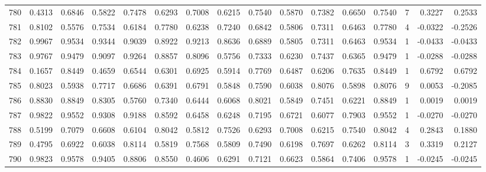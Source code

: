\begin{tabular}{lrrrrrrrrrrrrrrr}
780 &      0.4313 &  0.6846 &  0.5822 &  0.7478 &  0.6293 &  0.7008 &  0.6215 &  0.7540 &  0.5870 &  0.7382 &   0.6650 &     0.7540 &      7 &                    0.3227 &                     0.2533 \\
781 &      0.8102 &  0.5576 &  0.7534 &  0.6184 &  0.7780 &  0.6238 &  0.7240 &  0.6842 &  0.5806 &  0.7311 &   0.6463 &     0.7780 &      4 &                   -0.0322 &                    -0.2526 \\
782 &      0.9967 &  0.9534 &  0.9344 &  0.9039 &  0.8922 &  0.9213 &  0.8636 &  0.6889 &  0.5805 &  0.7311 &   0.6463 &     0.9534 &      1 &                   -0.0433 &                    -0.0433 \\
783 &      0.9767 &  0.9479 &  0.9097 &  0.9264 &  0.8857 &  0.8096 &  0.5756 &  0.7333 &  0.6230 &  0.7437 &   0.6365 &     0.9479 &      1 &                   -0.0288 &                    -0.0288 \\
784 &      0.1657 &  0.8449 &  0.4659 &  0.6544 &  0.6301 &  0.6925 &  0.5914 &  0.7769 &  0.6487 &  0.6206 &   0.7635 &     0.8449 &      1 &                    0.6792 &                     0.6792 \\
785 &      0.8023 &  0.5938 &  0.7717 &  0.6686 &  0.6391 &  0.6791 &  0.5848 &  0.7590 &  0.6038 &  0.8076 &   0.5898 &     0.8076 &      9 &                    0.0053 &                    -0.2085 \\
786 &      0.8830 &  0.8849 &  0.8305 &  0.5760 &  0.7340 &  0.6444 &  0.6068 &  0.8021 &  0.5849 &  0.7451 &   0.6221 &     0.8849 &      1 &                    0.0019 &                     0.0019 \\
787 &      0.9822 &  0.9552 &  0.9308 &  0.9188 &  0.8592 &  0.6458 &  0.6248 &  0.7195 &  0.6721 &  0.6077 &   0.7903 &     0.9552 &      1 &                   -0.0270 &                    -0.0270 \\
788 &      0.5199 &  0.7079 &  0.6608 &  0.6104 &  0.8042 &  0.5812 &  0.7526 &  0.6293 &  0.7008 &  0.6215 &   0.7540 &     0.8042 &      4 &                    0.2843 &                     0.1880 \\
789 &      0.4795 &  0.6922 &  0.6038 &  0.8114 &  0.5819 &  0.7568 &  0.5809 &  0.7490 &  0.6198 &  0.7697 &   0.6262 &     0.8114 &      3 &                    0.3319 &                     0.2127 \\
790 &      0.9823 &  0.9578 &  0.9405 &  0.8806 &  0.8550 &  0.4606 &  0.6291 &  0.7121 &  0.6623 &  0.5864 &   0.7406 &     0.9578 &      1 &                   -0.0245 &                    -0.0245 \\

\end{tabular}
